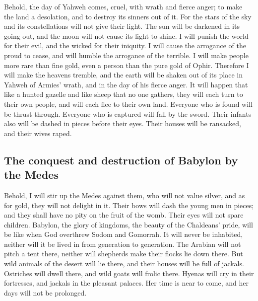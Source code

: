  Behold, the day of Yahweh comes, cruel, with wrath and
fierce anger; to make the land a desolation, and to destroy its sinners
out of it.  For the stars of the sky and its
constellations will not give their light. The sun will be darkened in
its going out, and the moon will not cause its light to shine.
 I will punish the world for their evil, and the wicked
for their iniquity. I will cause the arrogance of the proud to cease,
and will humble the arrogance of the terrible.  I will
make people more rare than fine gold, even a person than the pure gold
of Ophir.  Therefore I will make the heavens tremble, and
the earth will be shaken out of its place in Yahweh of Armies' wrath,
and in the day of his fierce anger.  It will happen that
like a hunted gazelle and like sheep that no one gathers, they will each
turn to their own people, and will each flee to their own land.
 Everyone who is found will be thrust through. Everyone
who is captured will fall by the sword.  Their infants
also will be dashed in pieces before their eyes. Their houses will be
ransacked, and their wives raped.

\hypertarget{the-conquest-and-destruction-of-babylon-by-the-medes}{%
\subsection{The conquest and destruction of Babylon by the
Medes}\label{the-conquest-and-destruction-of-babylon-by-the-medes}}

 Behold, I will stir up the Medes against them, who will
not value silver, and as for gold, they will not delight in it.
 Their bows will dash the young men in pieces; and they
shall have no pity on the fruit of the womb. Their eyes will not spare
children.  Babylon, the glory of kingdoms, the beauty of
the Chaldeans' pride, will be like when God overthrew Sodom and
Gomorrah.  It will never be inhabited, neither will it be
lived in from generation to generation. The Arabian will not pitch a
tent there, neither will shepherds make their flocks lie down there.
 But wild animals of the desert will lie there, and their
houses will be full of jackals. Ostriches will dwell there, and wild
goats will frolic there.  Hyenas will cry in their
fortresses, and jackals in the pleasant palaces. Her time is near to
come, and her days will not be prolonged.

